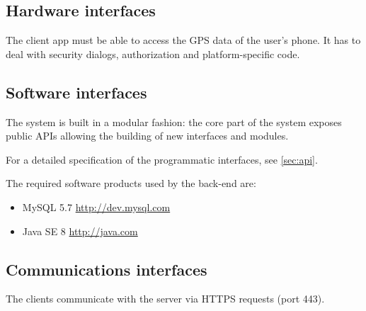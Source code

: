 \subsection{Hardware interfaces}

The client app must be able to access the GPS data of the user's phone.
It has to deal with security dialogs, authorization and platform-specific code.

\subsection{Software interfaces}
The system is built in a modular fashion: the core part of the system exposes public APIs allowing the building of new interfaces and modules.

For a detailed specification of the programmatic interfaces, see \autoref{sec:api}.

The required software products used by the back-end are:
\begin{itemize}
\item MySQL 5.7   \url{http://dev.mysql.com}
\item Java SE 8   \url{http://java.com}
\end{itemize}

\subsection{Communications interfaces}
The clients communicate with the server via HTTPS requests (port 443).
